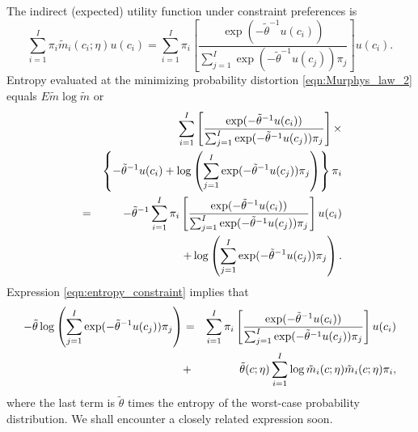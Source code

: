 \begin{enumerate}
The indirect (expected) utility function under constraint
preferences is
\begin{equation}\label{eq:indirect_constraint}
\sum_{i=1}^I   \pi_i \tilde m_i(c_i;\eta) u(c_i) = \sum_{i=1}^I  \pi_i \left[\frac{\exp(-\tilde \theta^{-1} u(c_i))}
  {\sum_{j=1}^I \exp(-\tilde \theta^{-1} u(c_j) ) \pi_j } \right]    u(c_i) .
\end{equation}
Entropy evaluated at the minimizing probability distortion   \eqref{eqn:Murphys_law_2} equals $E \tilde m \log \tilde m$  or
\begin{eqnarray}\label{eqn:entropy_constraint}
& & \sum_{i=1}^I   \left[\frac{\exp(-\tilde \theta^{-1} u(c_i))}
  {\sum_{j=1}^I \exp(-\tilde \theta^{-1} u(c_j) ) \pi_j } \right]  \times \cr
   & & \left\{ -\tilde \theta^{-1} u(c_i) + \log \left(\sum_{j=1}^I \exp(-\tilde \theta^{-1} u(c_j) ) \pi_j \right)
     \right\}  \pi_i \cr
  & = & -\tilde \theta^{-1} \sum_{i=1}^I  \pi_i \left[\frac{\exp(-\tilde \theta^{-1} u(c_i))}
  {\sum_{j=1}^I \exp(-\tilde \theta^{-1} u(c_j) ) \pi_j } \right]    u(c_i)  \cr
  & & + \log \left(\sum_{j=1}^I \exp(-\tilde \theta^{-1} u(c_j) ) \pi_j \right) .
     \end{eqnarray}
Expression \eqref{eqn:entropy_constraint} implies that
\begin{eqnarray}
 - \tilde \theta \log \left(\sum_{j=1}^I \exp(-\tilde \theta^{-1} u(c_j) ) \pi_j \right)  & = &
  \sum_{i=1}^I  \pi_i \left[\frac{\exp(-\tilde \theta^{-1} u(c_i))}
  {\sum_{j=1}^I \exp(-\tilde \theta^{-1} u(c_j) ) \pi_j } \right]    u(c_i) \cr
  & + &  \tilde \theta (c;\eta) \sum_{i=1}^I \log \tilde m_i(c;\eta) \tilde m_i(c;\eta) \pi_i ,
\end{eqnarray}
where the last term  is $\tilde \theta$ times the entropy of the worst-case probability distribution.   
% 
% 
% 
We shall encounter a closely related  expression  soon.


\end{enumerate}
